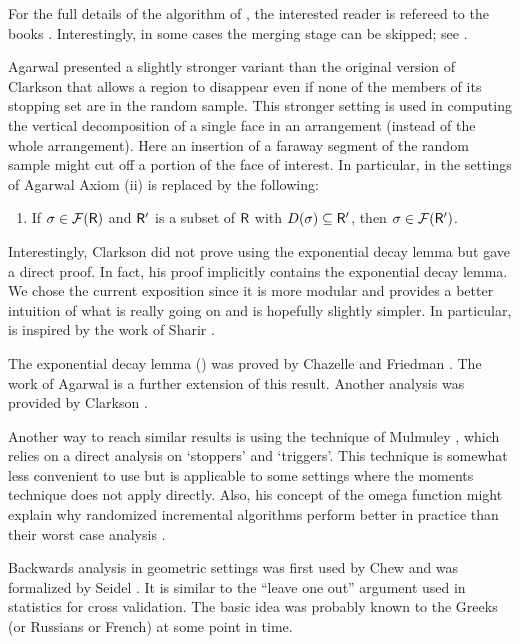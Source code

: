 For the full details of the algorithm of
, the interested reader is refereed to
the books \cite{bcko-cgaa-08, by-ag-98}. Interestingly, in some cases
the merging stage can be skipped; see \cite{h-cctp-00}.

Agarwal \etal \cite{ams-cmfal-98} presented a slightly stronger
variant than the original version of Clarkson \cite{c-arscg-88} that
allows a region to disappear even if none of the members of its
stopping set are in the random sample.  This stronger setting is used
in computing the vertical decomposition of a single face in an
arrangement (instead of the whole arrangement). Here an insertion of a
faraway segment of the random sample  might cut
off a portion of the face of interest. In particular, in the settings
of Agarwal \etal{} Axiom (ii) is replaced by the following:
\begin{enumerate}
    \item[(ii)]  %
    If $\Trap \in \RegionsSet{\Sample}$ and $\mathsf{R}'$ is a subset of
    $\mathsf{R}$ with $\DefSet{\Trap } \subseteq \SampleA$, then $\Trap
    \in \RegionsSet{\SampleA}$.
\end{enumerate}


Interestingly, Clarkson \cite{c-arscg-88} did not prove 
using the exponential decay lemma but gave a direct proof. In fact,
his proof implicitly contains the exponential decay lemma.  We chose
the current exposition since it is more modular and provides a better
intuition of what is really going on and is hopefully slightly
simpler.  In particular,  is inspired by the
work of Sharir \cite{s-cstre-01}.


The exponential decay lemma () was proved by
Chazelle and Friedman \cite{cf-dvrsi-90}. The work of Agarwal \etal
\cite{ams-cmfal-98} is a further extension of this result. Another
analysis was provided by Clarkson \etal \cite{cms-frric-93}.

Another way to reach similar results is using the technique of
Mulmuley \cite{m-cgitr-94}, which relies on a direct analysis on
`stoppers' and `triggers'. This technique is somewhat less convenient
to use but is applicable to some settings where the moments technique
does not apply directly.  Also, his concept of the omega function
might explain why randomized incremental algorithms perform better in
practice than their worst case analysis \cite{m-eahsr-89}.

Backwards analysis in geometric settings was first used by Chew
\cite{c-bvdcp-86} and was formalized by Seidel \cite{s-barga-93}. It
is similar to the ``leave one out'' argument used in statistics for
cross validation. The basic idea was probably known to the Greeks (or
Russians or French) at some point in time.

